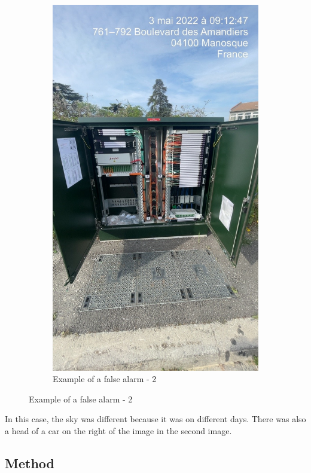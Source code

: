 \begin{figure}[H]
\begin{subfigure}{0.4\textwidth}
        \includegraphics[width=\linewidth]{images/false_positif/f3_2.jpg}
        \caption{Example of a false alarm - 2}
    \end{subfigure}
\end{figure}

In this case, the sky was different because it was on different days. There was also a head of a car on the right of the image in the second image.

\subsection{Method}

